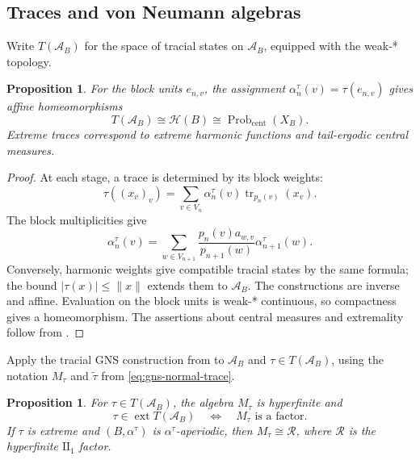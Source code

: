 \documentclass[11pt]{amsart}
\newtheorem{proposition}[theorem]{Proposition}
\theoremstyle{definition}
\theoremstyle{remark}
\begin{document}
\subsection{Traces and von Neumann algebras}
\label{subsec:trace-ranks}

Write $T(\mathcal A_B)$ for the space of tracial states on
$\mathcal A_B$, equipped with the weak-* topology.

\begin{proposition}\label{prop:trace-harmonic}
For the block units $e_{n,v}$, the assignment
$\alpha_n^\tau(v)=\tau(e_{n,v})$ gives affine homeomorphisms
\[
 T(\mathcal A_B)\cong\mathcal H(B)
 \cong\operatorname{Prob}_{\mathrm{cent}}(X_B).
\]
Extreme traces correspond to extreme harmonic functions and tail-ergodic
central measures.
\end{proposition}

\begin{proof}
At each stage, a trace is determined by its block weights:
\begin{equation}\label{eq:finite-trace-weights}
 \tau((x_v)_v)=\sum_{v\in V_n}\alpha_n^\tau(v)
                    \operatorname{tr}_{p_n(v)}(x_v).
\end{equation}
The block multiplicities give
\[
 \alpha_n^\tau(v)=\sum_{w\in V_{n+1}}
       \frac{p_n(v)a_{w,v}}{p_{n+1}(w)}\alpha_{n+1}^\tau(w).
\]
Conversely, harmonic weights give compatible tracial states by the same
formula; the bound $|\tau(x)|\leq\|x\|$ extends them to $\mathcal A_B$.
The constructions are inverse and affine.  Evaluation on the block units
is weak-* continuous, so compactness gives a homeomorphism.
The assertions about central measures and extremality follow from
.
\end{proof}

Apply the tracial GNS construction from
 to $\mathcal A_B$ and
$\tau\in T(\mathcal A_B)$, using the notation
$M_\tau$ and $\widetilde\tau$ from \eqref{eq:gns-normal-trace}.

\begin{proposition}\label{prop:tracial-gns-factor}
For $\tau\in T(\mathcal A_B)$, the algebra $M_\tau$ is hyperfinite and
\[
 \tau\in\operatorname{ext}T(\mathcal A_B)
 \quad\Longleftrightarrow\quad M_\tau\text{ is a factor}.
\]
If $\tau$ is extreme and $(B,\alpha^\tau)$ is
$\alpha^\tau$-aperiodic, then $M_\tau\cong\mathcal R$, where
$\mathcal R$ is the hyperfinite $\mathrm{II}_1$ factor.
\end{proposition}
\end{document}
